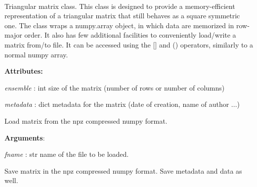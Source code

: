 \documentclass[letterpaper,10pt,english]{sphinxmanual}
\begin{document}

\begin{fulllineitems}
\label{index:encore.utils.Tee}~

\begin{fulllineitems}
\label{index:encore.utils.Tee.write}
\end{fulllineitems}


\end{fulllineitems}


\begin{fulllineitems}
\label{index:encore.utils.TriangularMatrix}
Triangular matrix class. This class is designed to provide a memory-efficient representation of a triangular matrix that still behaves as a square symmetric one. The class wraps a numpy.array object, in which data are memorized in row-major order. It also has few additional facilities to conveniently load/write a matrix from/to file. It can be accessed using the {[}{]} and () operators, similarly to a normal numpy array.

\textbf{Attributes:}

\emph{ensemble} : int
size of the matrix (number of rows or number of columns)

\emph{metadata} : dict
metadata for the matrix (date of creation, name of author ...)

\begin{fulllineitems}
\label{index:encore.utils.TriangularMatrix.loadz}
Load matrix from the npz compressed numpy format.

\textbf{Arguments}:

\emph{fname} : str
name of the file to be loaded.

\end{fulllineitems}


\begin{fulllineitems}
\label{index:encore.utils.TriangularMatrix.savez}
Save matrix in the npz compressed numpy format. Save metadata and data as well.


\end{fulllineitems}
\end{fulllineitems}
\end{document}
